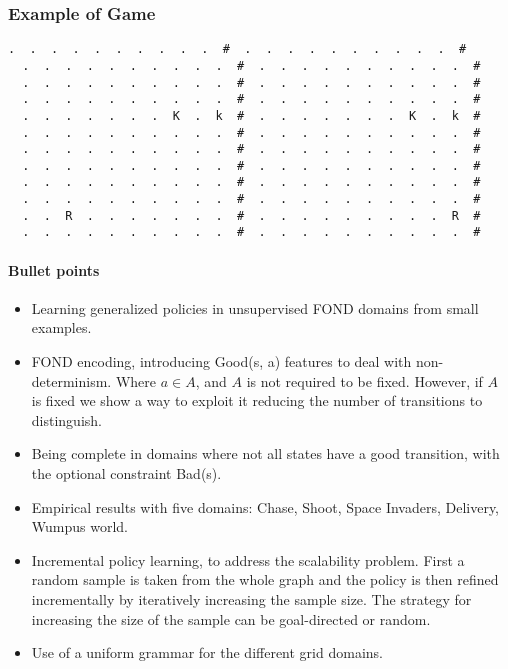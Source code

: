 \documentclass[a4paper]{article}
\begin{document}
\subsubsection{Example of Game}
\begin{Verbatim}[fontsize=\footnotesize]
  .  .  .  .  .  .  .  .  .  .  #  .  .  .  .  .  .  .  .  .  .  #
  .  .  .  .  .  .  .  .  .  .  #  .  .  .  .  .  .  .  .  .  .  #
  .  .  .  .  .  .  .  .  .  .  #  .  .  .  .  .  .  .  .  .  .  #
  .  .  .  .  .  .  .  .  .  .  #  .  .  .  .  .  .  .  .  .  .  #
  .  .  .  .  .  .  .  K  .  k  #  .  .  .  .  .  .  .  K  .  k  #
  .  .  .  .  .  .  .  .  .  .  #  .  .  .  .  .  .  .  .  .  .  #
  .  .  .  .  .  .  .  .  .  .  #  .  .  .  .  .  .  .  .  .  .  #
  .  .  .  .  .  .  .  .  .  .  #  .  .  .  .  .  .  .  .  .  .  #
  .  .  .  .  .  .  .  .  .  .  #  .  .  .  .  .  .  .  .  .  .  #
  .  .  .  .  .  .  .  .  .  .  #  .  .  .  .  .  .  .  .  .  .  #
  .  .  R  .  .  .  .  .  .  .  #  .  .  .  .  .  .  .  .  .  R  #
  .  .  .  .  .  .  .  .  .  .  #  .  .  .  .  .  .  .  .  .  .  #
\end{Verbatim}

\newpage

\paragraph{Bullet points}
\begin{itemize}
\item Learning generalized policies in unsupervised FOND domains from small examples.
\item FOND encoding, introducing Good(s, a) features to deal with non-determinism. Where $a \in A$, and $A$ is not required to be fixed. However, if $A$ is fixed we show a way to exploit it reducing the number of transitions to distinguish.
\item Being complete in domains where not all states have a good transition, with the optional constraint Bad(s).
\item Empirical results with five domains: Chase, Shoot, Space Invaders, Delivery, Wumpus world.
\item Incremental policy learning, to address the scalability problem. First a random sample is taken from the whole graph and the policy is then refined incrementally by iteratively increasing the sample size. The strategy for increasing the size of the sample can be goal-directed or random.
\item Use of a uniform grammar for the different grid domains.
\end{itemize}




\end{document}
